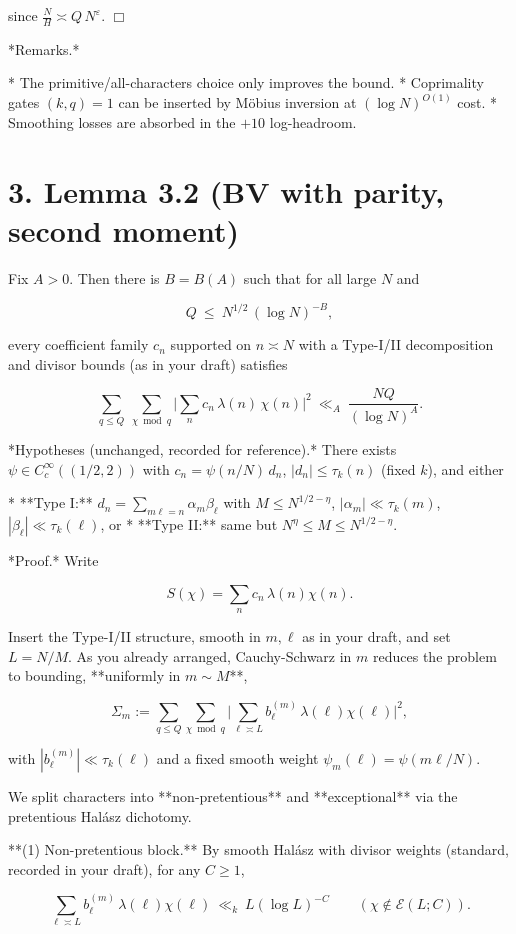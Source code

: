 \documentclass[11pt]{article}
\theoremstyle{definition}
\theoremstyle{remark}
\begin{document}
since $\frac{N}{H}\asymp Q\,N^{\varepsilon}$. $\Box$

*Remarks.*

* The primitive/all-characters choice only improves the bound.
* Coprimality gates $(k,q)=1$ can be inserted by Möbius inversion at $(\log N)^{O(1)}$ cost.
* Smoothing losses are absorbed in the $+10$ log-headroom.


\section*{3. Lemma 3.2 (BV with parity, second moment)}
Fix $A>0$. Then there is $B=B(A)$ such that for all large $N$ and

$$
	Q\ \le\ N^{1/2}\,(\log N)^{-B},
$$

every coefficient family $c_n$ supported on $n\asymp N$ with a Type-I/II decomposition and divisor bounds (as in your draft) satisfies

$$
	\sum_{q\le Q}\ \sum_{\chi\bmod q}
	\Bigg|\sum_{n} c_n\,\lambda(n)\,\chi(n)\Bigg|^2
	\ \ll_{A}\ \frac{NQ}{(\log N)^A}.
$$

*Hypotheses (unchanged, recorded for reference).*
There exists $\psi\in C_c^\infty((1/2,2))$ with $c_n=\psi(n/N)\,d_n$, $|d_n|\le \tau_k(n)$ (fixed $k$), and either

* **Type I:** $d_n=\sum_{m\ell=n}\alpha_m\beta_\ell$ with $M\le N^{1/2-\eta}$, $|\alpha_m|\ll \tau_k(m)$, $|\beta_\ell|\ll \tau_k(\ell)$, or
* **Type II:** same but $N^{\eta}\le M\le N^{1/2-\eta}$.

*Proof.* Write

$$
	S(\chi)=\sum_{n} c_n\,\lambda(n)\chi(n).
$$

Insert the Type-I/II structure, smooth in $m,\ell$ as in your draft, and set $L=N/M$. As you already arranged, Cauchy-Schwarz in $m$ reduces the problem to bounding, **uniformly in $m\sim M$**,

$$
	\Sigma_m:=\sum_{q\le Q}\sum_{\chi\bmod q}\Big|\sum_{\ell\asymp L} b^{(m)}_\ell\,\lambda(\ell)\chi(\ell)\Big|^2,
$$

with $|b^{(m)}_\ell|\ll \tau_k(\ell)$ and a fixed smooth weight $\psi_m(\ell)=\psi(m\ell/N)$.

We split characters into **non-pretentious** and **exceptional** via the pretentious Halász dichotomy.

**(1) Non-pretentious block.**
By smooth Halász with divisor weights (standard, recorded in your draft), for any $C\ge 1$,

$$
	\sum_{\ell\asymp L} b^{(m)}_\ell\,\lambda(\ell)\chi(\ell)\ \ll_k\ L(\log L)^{-C}
	\qquad(\chi\notin\mathcal E(L;C)).
$$
\end{document}
